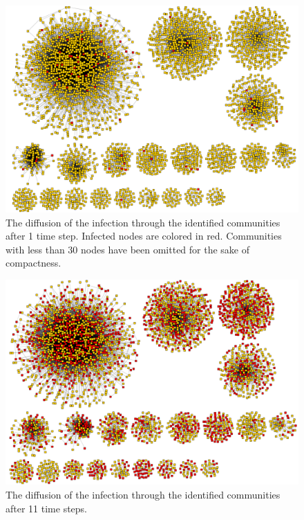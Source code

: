 \documentclass[12pt, oneside, openany]{article} %
\begin{document}
\begin{figure}
\centering
    \includegraphics[scale=0.25]{step1.png}
    \caption{The diffusion of the infection through the identified communities after 1 time step. Infected nodes are colored in red. Communities with less than 30 nodes have been omitted for the sake of compactness.}
    \label{fig:net-time1}
\end{figure}

\begin{figure}
\centering
    \includegraphics[scale=0.25]{step11.png}
    \caption{The diffusion of the infection through the identified communities after 11 time steps.}
    \label{fig:net-time11}
\end{figure}
\end{document}
